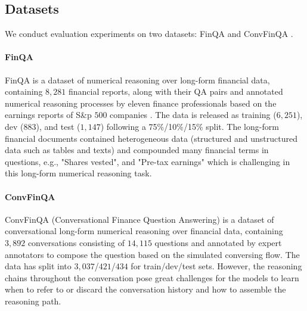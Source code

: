 \documentclass[11pt]{article}
\begin{document}
\subsection{Datasets}
We conduct evaluation experiments on two datasets: FinQA \cite{chen2021finqa} and ConvFinQA \cite{convfinqa}.

\paragraph{FinQA}
FinQA is a dataset of numerical reasoning over long-form financial data, containing $8,281$ financial reports, along with their QA pairs and annotated numerical reasoning processes by eleven finance professionals based on the earnings reports of S\&p $500$ companies \cite{zheng2021global}. The data is released as training ($6,251$), dev ($883$), and test ($1,147$) following a 75\%/10\%/15\% split. The long-form financial documents contained heterogeneous data (structured and unstructured data such as tables and texts) and compounded many financial terms in questions, e.g., "Shares vested", and "Pre-tax earnings" which is challenging in this long-form numerical reasoning task.

\paragraph{ConvFinQA}
ConvFinQA (Conversational Finance Question Answering) is a dataset of conversational long-form numerical reasoning over financial data, containing $3,892$ conversations consisting of $14,115$ questions and annotated by expert annotators to compose the question based on the simulated conversing flow. The data has split into $3,037$/$421$/$434$ for train/dev/test sets. However, the reasoning chains throughout the conversation pose great challenges for the models to learn when to refer to or discard the conversation history and how to assemble the reasoning path.

\end{document}

